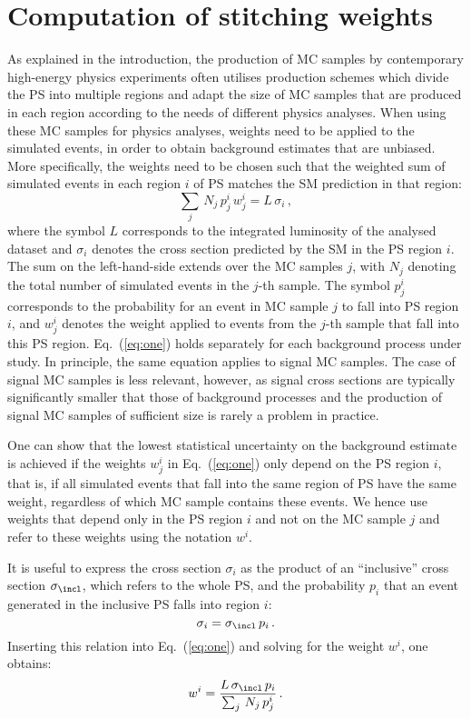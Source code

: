 \section{Computation of stitching weights}
\label{sec:stitching_weights}

As explained in the introduction,
the production of MC samples by contemporary high-energy physics experiments often utilises production schemes
which divide the PS into multiple regions and adapt the size of MC samples that are produced in each region 
according to the needs of different physics analyses.
When using these MC samples for physics analyses,
weights need to be applied to the simulated events, in order to obtain background estimates that are unbiased.
More specifically, the weights need to be chosen such that the weighted sum of simulated events in each region $i$ of PS 
matches the SM prediction in that region:
\begin{equation}
\sum_{j} \, N_{j} \, p_{j}^{i} \, w_{j}^{i} = L \, \sigma_{i} \, ,
\label{eq:one}
\end{equation}
where the symbol $L$ corresponds to the integrated luminosity of the analysed dataset
and $\sigma_{i}$ denotes the cross section predicted by the SM in the PS region $i$.
The sum on the left-hand-side extends over the MC samples $j$,
with $N_{j}$ denoting the total number of simulated events in the $j$-th sample.
The symbol $p_{j}^{i}$ corresponds to the probability for an event in MC sample $j$ to fall into PS region $i$,
and $w_{j}^{i}$ denotes the weight applied to events from the $j$-th sample that fall into this PS region.
Eq.~(\ref{eq:one}) holds separately for each background process under study.
In principle, the same equation applies to signal MC samples. 
The case of signal MC samples is less relevant, however,
as signal cross sections are typically significantly smaller that those of background processes 
and the production of signal MC samples of sufficient size is rarely a problem in practice.

One can show that the lowest statistical uncertainty on the background estimate is achieved 
if the weights $w_{j}^{i}$ in Eq.~(\ref{eq:one}) only depend on the PS region $i$,
that is, if all simulated events that fall into the same region of PS have the same weight,
regardless of which MC sample contains these events.
We hence use weights that depend only in the PS region $i$ and not on the MC sample $j$ 
and refer to these weights using the notation $w^{i}$.

It is useful to express the cross section $\sigma_{i}$ as the product of an ``inclusive'' cross section $\sigma_{\incl}$,
which refers to the whole PS, and the probability $p_{i}$ that an event generated in the inclusive PS falls into region $i$:
\begin{equation*}
\sigma_{i} = \sigma_{\incl} \, p_{i} \, .
\label{eq:two}
\end{equation*}
Inserting this relation into Eq.~(\ref{eq:one}) and solving for the weight $w^{i}$, one obtains:
\begin{equation}
w^{i} = \frac{L \, \sigma_{\incl} \, p_{i}}{\sum_{j} \, N_{j} \, p_{j}^{i}} \, .
\label{eq:master}
\end{equation}

